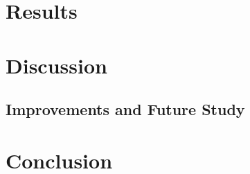 \documentclass[a4paper,11pt,notitlepage]{article}
\begin{document}

\newpage

\section{Results}


\section{Discussion}


\subsection{Improvements and Future Study}


\section{Conclusion}


\newpage



\end{document}

